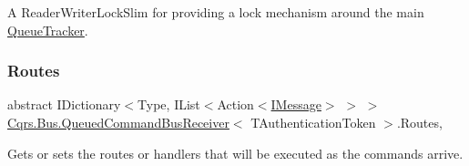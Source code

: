 A Reader\+Writer\+Lock\+Slim for providing a lock mechanism around the main \hyperlink{classCqrs_1_1Bus_1_1QueuedCommandBusReceiver_a2fc62989429929acd8ea66808a8c4a78_a2fc62989429929acd8ea66808a8c4a78}{Queue\+Tracker}. 

\mbox{\label{classCqrs_1_1Bus_1_1QueuedCommandBusReceiver_ad69fe38758694599261bad82e6c6378c_ad69fe38758694599261bad82e6c6378c}} 
\subsubsection{\texorpdfstring{Routes}{Routes}}
{\footnotesize\ttfamily abstract I\+Dictionary$<$Type, I\+List$<$Action$<$\hyperlink{interfaceCqrs_1_1Messages_1_1IMessage}{I\+Message}$>$ $>$ $>$ \hyperlink{classCqrs_1_1Bus_1_1QueuedCommandBusReceiver}{Cqrs.\+Bus.\+Queued\+Command\+Bus\+Receiver}$<$ T\+Authentication\+Token $>$.Routes\hspace{0.3cm}{\ttfamily [get]}, {\ttfamily [protected]}}



Gets or sets the routes or handlers that will be executed as the commands arrive. 

